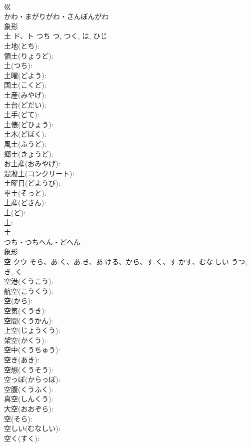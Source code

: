 \documentclass[8pt]{extreport}
\begin{document}
\begin{CJK}{UTF8}{min}
\\	巛	
\\	かわ・まがりがわ・さんぼんがわ	
\\	象形 
\\	土	ド、ト	つち	つ, つく, は, ひじ	
\\	土地(とち): 
\\	領土(りょうど): 
\\	土(つち): 
\\	土曜(どよう): 
\\	国土(こくど): 
\\	土産(みやげ): 
\\	土台(どだい): 
\\	土手(どて): 
\\	土俵(どひょう): 
\\	土木(どぼく): 
\\	風土(ふうど): 
\\	郷土(きょうど): 
\\	お土産(おみやげ): 
\\	混凝土(コンクリート): 
\\	土曜日(どようび): 
\\	率土(そっと): 
\\	土産(どさん): 
\\	土(ど): 
\\	土: 
\\	土	
\\	つち・つちへん・どへん	
\\	象形 
\\	空	クウ	そら、あ.く、あ.き、あ.ける、から、す.く、す.かす、むな.しい	うつ, き, く	
\\	空港(くうこう): 
\\	航空(こうくう): 
\\	空(から): 
\\	空気(くうき): 
\\	空間(くうかん): 
\\	上空(じょうくう): 
\\	架空(かくう): 
\\	空中(くうちゅう): 
\\	空き(あき): 
\\	空想(くうそう): 
\\	空っぽ(からっぽ): 
\\	空腹(くうふく): 
\\	真空(しんくう): 
\\	大空(おおぞら): 
\\	空(そら): 
\\	空しい(むなしい): 
\\	空く(すく): 

\end{CJK}
\end{document}

